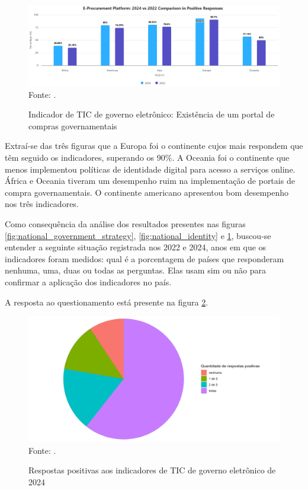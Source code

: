 \begin{figure}[H]
	\centering
	\caption{Indicador de TIC de governo eletrônico: Existência de um portal de compras governamentais}
	\includegraphics[width=1\linewidth]{figuras/procurement_portal}
	\label{fig:procurement_portal}
	\footnotesize{Fonte: \cite{ONU_ICT_in_government_indicators}.}
\end{figure}

Extraí-se das três figuras que a Europa foi o continente cujos mais respondem que têm seguido os indicadores, superando os 90\%. A Oceania foi o continente que menos implementou políticas de identidade digital para acesso a serviços online. África e Oceania tiveram um desempenho ruim na implementação de portais de compra governamentais. O continente americano apresentou bom desempenho nos três indicadores.

Como consequência da análise dos resultados presentes nas figuras \ref{fig:national_government_strategy}, \ref{fig:national_identity} e \ref{fig:procurement_portal}, buscou-se entender a seguinte situação registrada nos 2022 e 2024, anos em que os indicadores foram medidos: qual é a porcentagem de países que responderam nenhuma, uma, duas ou todas as perguntas. Elas usam sim ou não para confirmar a aplicação dos indicadores no país.

A resposta ao questionamento está presente na figura \ref{fig:ticegov_soma_respostas_positivas}.

\begin{figure}[H]
	\centering
	\caption{Respostas positivas aos indicadores de TIC de governo eletrônico de 2024}
	\includegraphics[width=1\linewidth]{figuras/ticegov_soma_respostas_positivas}
	\label{fig:ticegov_soma_respostas_positivas}
	\footnotesize{Fonte: \cite{ONU_ICT_in_government_indicators}.}
\end{figure}

